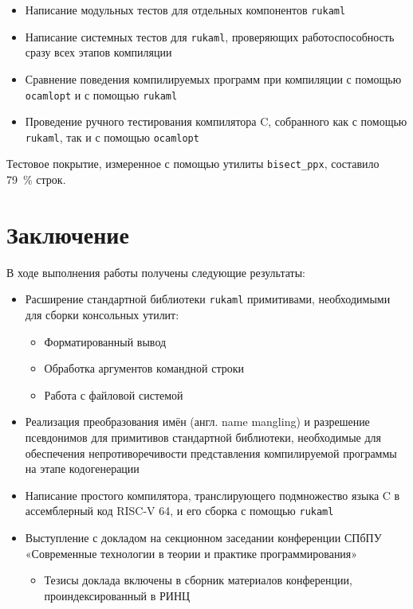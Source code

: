 \documentclass[a4paper]{article}
\begin{document}
\begin{itemize}
    \item Написание модульных тестов для отдельных компонентов \texttt{\large rukaml}
    \item Написание системных тестов для \texttt{\large rukaml}, проверяющих работоспособность сразу всех этапов компиляции
    \item Сравнение поведения компилируемых программ при компиляции с помощью \texttt{\large ocamlopt} и с помощью \texttt{\large rukaml}
    \item Проведение ручного тестирования компилятора C, собранного как с помощью \texttt{\large rukaml}, так и с помощью \texttt{\large ocamlopt}
\end{itemize}


Тестовое покрытие, измеренное с помощью утилиты \texttt{\large bisect\_ppx}, составило 79~\% строк.


\section{Заключение}

В ходе выполнения работы получены следующие результаты:


\begin{itemize}
    \item Расширение стандартной библиотеки \texttt{\large rukaml} примитивами, необходимыми для сборки консольных утилит:
          \begin{itemize}
              \item Форматированный вывод
              \item Обработка аргументов командной строки
              \item Работа с файловой системой
          \end{itemize}
    \item Реализация преобразования имён (англ. name mangling) и разрешение псевдонимов для примитивов стандартной библиотеки, необходимые для обеспечения непротиворечивости представления компилируемой программы на этапе кодогенерации
    \item Написание простого компилятора, транслирующего подмножество языка C в ассемблерный код RISC-V 64, и его сборка с помощью \texttt{\large rukaml}
    \item Выступление с докладом на секционном заседании конференции СПбПУ «Современные технологии в теории и практике программирования»
          \begin{itemize}
              \item Тезисы доклада включены в сборник материалов конференции, проиндексированный в РИНЦ
          \end{itemize}
\end{itemize}
\end{document}
